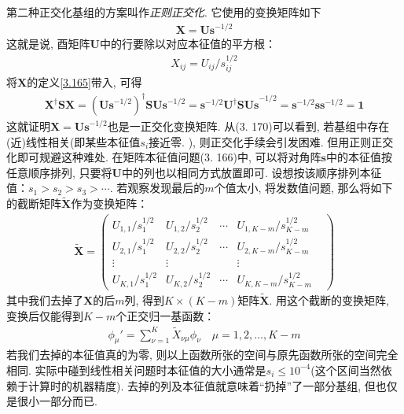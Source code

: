 第二种正交化基组的方案叫作\emph{正则正交化}. 
它使用的变换矩阵如下
\begin{align}
	\mathbf{X=Us}^{-1/2}
\end{align}
这就是说, 
酉矩阵$\mathbf{U}$中的行要除以对应本征值的平方根：
\begin{align}
	X_{ij} = U_{ij}/s_{ij}^{1/2}
\end{align}
将$\mathbf{X}$的定义\eqref{3.165}带入, 
可得
\begin{align}
	\mathbf{X^\dagger SX} = (\mathbf{Us}^{-1/2})^\dagger\mathbf{SUs}^{-1/2} = \mathbf{s}^{-1/2}\mathbf{U^\dagger SUs}^{-1/2} = \mathbf{s}^{-1/2}\mathbf{ss}^{-1/2}=\mathbf{1}
\end{align}
这就证明$\mathbf{X=Us}^{-1/2}$也是一正交化变换矩阵. 
从(3.
170)可以看到, 
若基组中存在(近)线性相关(即某些本征值$s_i$接近零.
), 
则正交化手续会引发困难. 
但用正则正交化即可规避这种难处. 
在矩阵本征值问题(3.
166)中, 
可以将对角阵$\mathbf{s}$中的本征值按任意顺序排列, 
只要将$\mathbf{U}$中的列也以相同方式放置即可. 
设想按该顺序排列本征值：$s_1>s_2>s_3>\cdots$. 
若观察发现最后的$m$个值太小, 
将发数值问题, 
那么将如下的截断矩阵$\mathbf{\tilde{X}}$作为变换矩阵：
\begin{align}
	\tilde{\mathbf{X}} =
	\begin{pmatrix}
		U_{1,1}/s^{1/2}_{1} & U_{1,2}/s^{1/2}_{2} & \cdots & U_{1,K-m}/s^{1/2}_{K-m} &  \\
		U_{2,1}/s^{1/2}_{1} & U_{2,2}/s^{1/2}_{2} & \cdots & U_{2,K-m}/s^{1/2}_{K-m} &  \\
		\vdots              & \vdots              &        & \vdots                  &  \\
		U_{K,1}/s^{1/2}_{1} & U_{K,2}/s^{1/2}_{2} & \cdots & U_{K,K-m}/s^{1/2}_{K-m} &
	\end{pmatrix}
\end{align}
其中我们去掉了$\mathbf{X}$的后$m$列, 
得到$K\times (K-m)$矩阵$\tilde{\mathbf{X}}$. 
用这个截断的变换矩阵, 
变换后仅能得到$K-m$个正交归一基函数：
\begin{align}
	\phi_\mu' = \sum_{\nu=1}^{K}\tilde{X}_{\nu\mu}\phi_\nu\quad\mu=1,2,\ldots,K-m
\end{align}
若我们去掉的本征值真的为零, 
则以上函数所张的空间与原先函数所张的空间完全相同. 
实际中碰到线性相关问题时本征值的大小通常是$s_i\leqslant 10^{-4}$(这个区间当然依赖于计算时的机器精度). 
去掉的列及本征值就意味着``扔掉''了一部分基组, 
但也仅是很小一部分而已.


